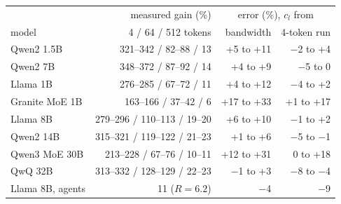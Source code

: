 \begin{tabular}{@{}lrrr@{}}
\toprule
 & measured gain (\%) & \multicolumn{2}{c}{error (\%), $c_l$ from} \\
model & 4 / 64 / 512 tokens & bandwidth & 4-token run \\
\midrule
Qwen2 1.5B & 321--342 / 82--88 / 13 & +5 to +11 & $-$2 to +4 \\
Qwen2 7B & 348--372 / 87--92 / 14 & +4 to +9 & $-$5 to 0 \\
Llama 1B & 276--285 / 67--72 / 11 & +4 to +12 & $-$4 to +2 \\
Granite MoE 1B & 163--166 / 37--42 / 6 & +17 to +33 & +1 to +17 \\
\midrule
Llama 8B & 279--296 / 110--113 / 19--20 & +6 to +10 & $-$1 to +2 \\
Qwen2 14B & 315--321 / 119--122 / 21--23 & +1 to +6 & $-$5 to $-$1 \\
Qwen3 MoE 30B & 213--228 / 67--76 / 10--11 & +12 to +31 & 0 to +18 \\
QwQ 32B & 313--332 / 128--129 / 22--23 & $-$1 to +3 & $-$8 to $-$4 \\
\midrule
Llama 8B, agents & 11 ($R=6.2$) & $-$4 & $-$9 \\
\bottomrule
\end{tabular}

